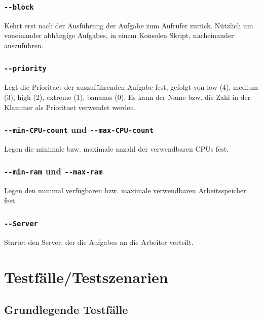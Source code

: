 \documentclass[a4paper,12pt]{article}
\begin{document}
\subsubsection{\texttt{-{}-block}}
Kehrt erst nach der Ausführung der \gls{Aufgabe} zum Aufrufer zurück. Nützlich um voneinander abhängige \glspl{Aufgabe}, in einem Konsolen Skript, nacheinander auszuführen.

\subsubsection{\texttt{-{}-priority}}
Legt die \gls{Prioritaet} der auszuführenden \gls{Aufgabe} fest, gefolgt von low (4), medium (3), high (2), extreme (1), bananas (0).
Es kann der Name bzw. die Zahl in der Klammer als \gls{Prioritaet} verwendet werden.

\subsubsection{\texttt{-{}-min-\gls{CPU}-count} und \texttt{-{}-max-\gls{CPU}-count}}
Legen die minimale bzw. maximale anzahl der verwendbaren \glspl{CPU} fest.

\subsubsection{\texttt{-{}-min-ram} und \texttt{-{}-max-ram}}
Legen den minimal verfügbaren bzw. maximale verwendbaren Arbeitsspeicher fest.

\subsubsection{\texttt{-{}-\gls{Server}}}
Startet den \gls{Server}, der die \glspl{Aufgabe} an die Arbeiter verteilt.


\clearpage
\section{Testfälle/Testszenarien}
\subsection{Grundlegende Testfälle}
\end{document}

